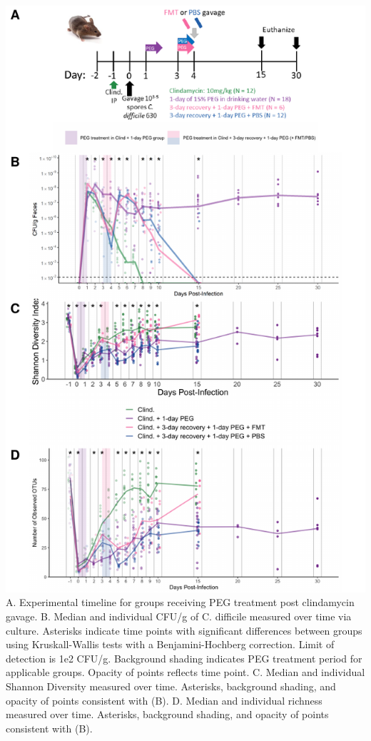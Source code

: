 \documentclass[
  11pt,
]{article}
\begin{document}
\includegraphics{figure_5.pdf} A. Experimental timeline for groups
receiving PEG treatment post clindamycin gavage. B. Median and
individual CFU/g of C. difficile measured over time via culture.
Asterisks indicate time points with significant differences between
groups using Kruskall-Wallis tests with a Benjamini-Hochberg correction.
Limit of detection is 1e2 CFU/g. Background shading indicates PEG
treatment period for applicable groups. Opacity of points reflects time
point. C. Median and individual Shannon Diversity measured over time.
Asterisks, background shading, and opacity of points consistent with
(B). D. Median and individual richness measured over time. Asterisks,
background shading, and opacity of points consistent with (B).
\end{document}
